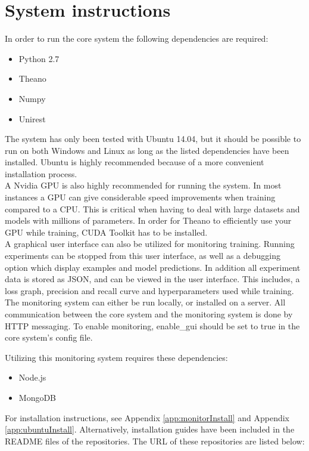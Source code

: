 \section{System instructions}
In order to run the core system the following dependencies are required:
\begin{itemize}
\item Python 2.7
\item Theano
\item Numpy
\item Unirest
\end{itemize}

The system has only been tested with Ubuntu 14.04, but it should be possible to run on both Windows and Linux as long as the listed dependencies have been installed. Ubuntu is highly recommended because of a more convenient installation process. \\

A Nvidia GPU is also highly recommended for running the system. In most instances a GPU can give considerable speed improvements when training compared to a CPU. This is critical when having to deal with large datasets and models with millions of parameters. In order for Theano to efficiently use your GPU while training, CUDA Toolkit has to be installed. \\

A graphical user interface can also be utilized for monitoring training. Running experiments can be stopped from this user interface, as well as a debugging option which display examples and model predictions. In addition all experiment data is stored as JSON, and can be viewed in the user interface. This includes, a loss graph, precision and recall curve and hyperparameters used while training. \\

The monitoring system can either be run locally, or installed on a server. All communication between the core system and the monitoring system is done by HTTP messaging. To enable monitoring, enable\_gui should be set to true in the core system's config file.

Utilizing this monitoring system requires these dependencies:
\begin{itemize}
\item Node.js
\item MongoDB
\end{itemize}

For installation instructions, see Appendix \ref{app:monitorInstall} and Appendix \ref{app:ubuntuInstall}. Alternatively, installation guides have been included in the README files of the repositories. The URL of these repositories are listed below:

